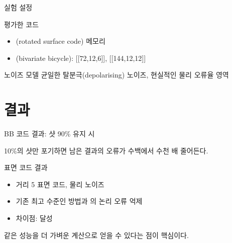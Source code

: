 \begin{frame}{실험 설정}
  \begin{block}{평가한 코드}
    \begin{itemize}
      \item {}(rotated surface code) 메모리
      \item {}(bivariate bicycle): [[72,12,6]], [[144,12,12]]
    \end{itemize}
  \end{block}
  \tightgap
  \begin{exampleblock}{노이즈 모델}
    \small 균일한 탈분극(depolarising)  노이즈, 현실적인 물리 오류율 영역
  \end{exampleblock}
\end{frame}

\renewcommand{\secblurb}{90\%만 남겨도 논리 오류가 수백에서 수천 배 줄어든다}
\section{결과}

\begin{frame}{BB 코드 결과: 샷 90\% 유지 시}
  \centering
  \deckgap
  \hfill
  \hfill
  \deckgap\deckgap
  \begin{callout}[해석]
    10\%의 샷만 포기하면 남은 결과의 오류가 수백에서 수천 배 줄어든다.
  \end{callout}
\end{frame}

\begin{frame}{표면 코드 결과}
  \begin{itemize}
    \item 거리 5 표면 코드, 물리 노이즈 
    \item 기존 최고 수준인  방법과 의 논리 오류 억제
    \item 차이점:  달성
  \end{itemize}
  \deckgap
  \begin{callout}[의미]
    같은 성능을 더 가벼운 계산으로 얻을 수 있다는 점이 핵심이다.
  \end{callout}
\end{frame}

\renewcommand{\secblurb}{해설자가 보기에 앞으로 확인할 부분}
